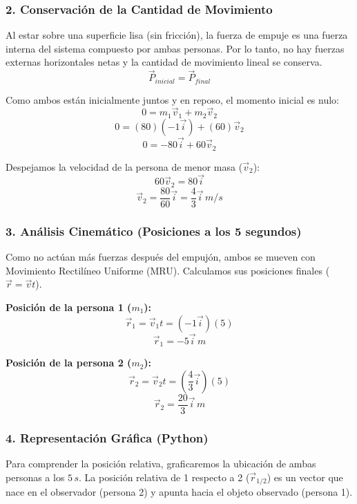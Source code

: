 \documentclass[12pt, a4paper]{article}
\begin{document}
\subsubsection*{2. Conservación de la Cantidad de Movimiento}
Al estar sobre una superficie lisa (sin fricción), la fuerza de empuje es una fuerza interna del sistema compuesto por ambas personas. Por lo tanto, no hay fuerzas externas horizontales netas y la cantidad de movimiento lineal se conserva.
\[ \vec{P}_{inicial} = \vec{P}_{final} \]

Como ambos están inicialmente juntos y en reposo, el momento inicial es nulo:
\[ 0 = m_1 \vec{v}_1 + m_2 \vec{v}_2 \]
\[ 0 = (80) (-1 \vec{i}) + (60) \vec{v}_2 \]
\[ 0 = -80 \vec{i} + 60 \vec{v}_2 \]

Despejamos la velocidad de la persona de menor masa ($\vec{v}_2$):
\[ 60 \vec{v}_2 = 80 \vec{i} \]
\[ \vec{v}_2 = \frac{80}{60} \vec{i} = \frac{4}{3} \vec{i} \, \si{m/s} \]

\subsubsection*{3. Análisis Cinemático (Posiciones a los 5 segundos)}
Como no actúan más fuerzas después del empujón, ambos se mueven con Movimiento Rectilíneo Uniforme (MRU). Calculamos sus posiciones finales ($\vec{r} = \vec{v} t$).

\textbf{Posición de la persona 1 ($m_1$):}
\[ \vec{r}_1 = \vec{v}_1 t = (-1 \vec{i})(5) \]
\[ \vec{r}_1 = -5 \vec{i} \, \si{m} \]

\textbf{Posición de la persona 2 ($m_2$):}
\[ \vec{r}_2 = \vec{v}_2 t = \left(\frac{4}{3} \vec{i}\right)(5) \]
\[ \vec{r}_2 = \frac{20}{3} \vec{i} \, \si{m} \]

\subsubsection*{4. Representación Gráfica (Python)}
Para comprender la posición relativa, graficaremos la ubicación de ambas personas a los $5 \, \si{s}$. La posición relativa de 1 respecto a 2 ($\vec{r}_{1/2}$) es un vector que nace en el observador (persona 2) y apunta hacia el objeto observado (persona 1).
\end{document}
